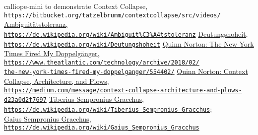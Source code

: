 \documentclass[a4,parindent=0pt]{article}
\begin{document}
\begin{thebibliography}{88}
{  calliope-mini to demonstrate Context Collapse,\\
\texttt{https://bitbucket.org/tatzelbrumm/contextcollapse/src/videos/}}
  \href{https://de.wikipedia.org/wiki/Ambiguit\%C3\%A4tstoleranz}{Ambiguitätstoleranz,\\
\texttt{https://de.wikipedia.org/wiki/Ambiguit\%C3\%A4tstoleranz}}
  \href{https://de.wikipedia.org/wiki/Deutungshoheit}{Deutungshoheit,\\
\texttt{https://de.wikipedia.org/wiki/Deutungshoheit}}
  \href{https://www.theatlantic.com/technology/archive/2018/02/the-new-york-times-fired-my-doppelganger/554402/}{Quinn
  Norton: The New York Times Fired My Doppelgänger,\\
\texttt{https://www.theatlantic.com/technology/archive/2018/02/\\the-new-york-times-fired-my-doppelganger/554402/}}
  \href{https://medium.com/message/context-collapse-architecture-and-plows-d23a0d2f7697}{Quinn Norton: Context Collapse, Architecture, and Plows,\\
\texttt{https://medium.com/message/context-collapse-architecture-and-plows-d23a0d2f7697}}
  \href{https://de.wikipedia.org/wiki/Tiberius_Sempronius_Gracchus}{Tiberius Sempronius Gracchus,\\
\texttt{https://de.wikipedia.org/wiki/Tiberius\_Sempronius\_Gracchus}};\\
\href{https://de.wikipedia.org/wiki/Gaius_Sempronius_Gracchus}{Gaius Sempronius Gracchus,\\
\texttt{https://de.wikipedia.org/wiki/Gaius\_Sempronius\_Gracchus}}

\end{thebibliography}
\end{document}
